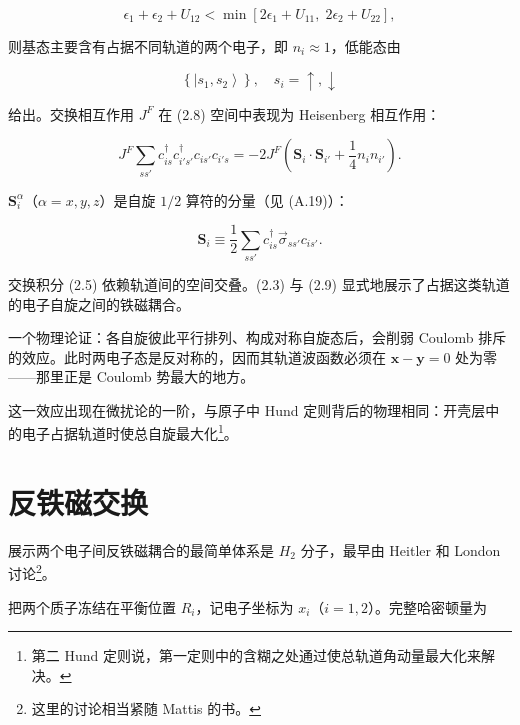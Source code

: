 \begin{equation*}
\epsilon_ {1} + \epsilon_ {2} + U _ {12} < \min \left[ 2 \epsilon_ {1} + U _ {11}, \; 2 \epsilon_ {2} + U _ {22} \right],
\tag{2.7}
\end{equation*}

则基态主要含有占据不同轨道的两个电子，即 $n_{i} \approx 1$，低能态由

\begin{equation*}
\left\{ \left| s _ {1}, s _ {2} \right\rangle \right\} , \quad s _ {i} = \uparrow , \downarrow
\tag{2.8}
\end{equation*}

给出。交换相互作用 $J^{F}$ 在 (2.8) 空间中表现为 Heisenberg 相互作用：

\begin{equation*}
J ^ {F} \sum_ {ss'} c _ {is} ^ {\dagger} c _ {i's'} ^ {\dagger} c _ {is'} c _ {i's} = - 2 J ^ {F} \left( \mathbf {S} _ {i} \cdot \mathbf {S} _ {i'} + \frac {1}{4} n _ {i} n _ {i'} \right).
\tag{2.9}
\end{equation*}

$\mathbf{S}_i^\alpha$（$\alpha = x, y, z$）是自旋 $1/2$ 算符的分量（见 (A.19)）：

\begin{equation*}
\mathbf {S} _ {i} \equiv \frac {1}{2} \sum_ {ss'} c _ {is} ^ {\dagger} \vec {\sigma} _ {ss'} c _ {is'}.
\tag{2.10}
\end{equation*}

交换积分 (2.5) 依赖轨道间的空间交叠。(2.3) 与 (2.9) 显式地展示了占据这类轨道的电子自旋之间的铁磁耦合。

一个物理论证：各自旋彼此平行排列、构成对称自旋态后，会削弱 Coulomb 排斥的效应。此时两电子态是反对称的，因而其轨道波函数必须在 $\mathbf{x} - \mathbf{y} = 0$ 处为零——那里正是 Coulomb 势最大的地方。

这一效应出现在微扰论的一阶，与原子中 Hund 定则背后的物理相同：开壳层中的电子占据轨道时使总自旋最大化\footnote{第二 Hund 定则说，第一定则中的含糊之处通过使总轨道角动量最大化来解决。}。

\section{反铁磁交换}

展示两个电子间反铁磁耦合的最简单体系是 $H_{2}$ 分子，最早由 Heitler 和 London 讨论\footnote{这里的讨论相当紧随 Mattis 的书。}。

把两个质子冻结在平衡位置 $R_{i}$，记电子坐标为 $x_{i}$（$i = 1, 2$）。完整哈密顿量为

